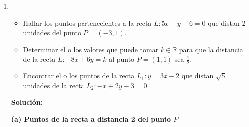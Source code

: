 \documentclass[11pt]{article}
\begin{document}
\begin{enumerate}[\hspace{-5mm} 1) ]
\begin{center}
\end{center}



















  \item \,
\begin{itemize}
    \item[(a)] Hallar los puntos pertenecientes a la recta $L : 5x - y + 6 = 0$ que distan 2 unidades del punto $P = (-3, 1)$.
    \item[(b)] Determinar el o los valores que puede tomar $k \in \mathbb{R}$ para que la distancia de la recta $L : -8x + 6y = k$ al punto $P = (1, 1)$ sea $\frac{1}{2}$.
    \item[(c)] Encontrar el o los puntos de la recta $L_1 : y = 3x - 2$ que distan $\sqrt{5}$ unidades de la recta \linebreak $L_2 : -x + 2y - 3 = 0$.
\end{itemize}
   











\textbf{Solución:}

\textbf{(a) Puntos de la recta a distancia 2 del punto $P$}

\begin{itemize}
\end{itemize}



\end{enumerate}
\end{document}
